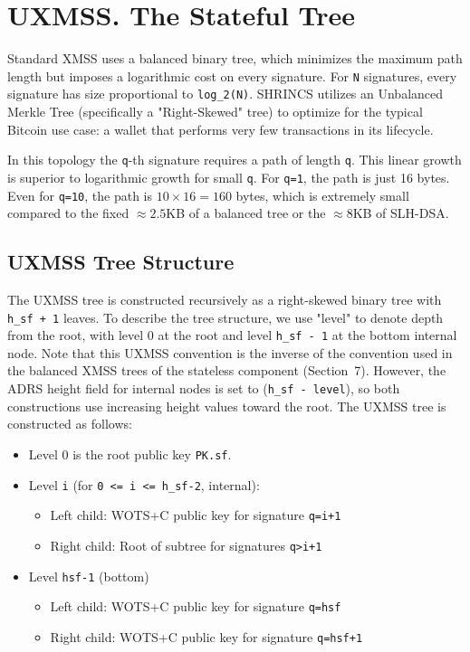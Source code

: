 \section{UXMSS. The Stateful Tree}
Standard XMSS uses a balanced binary tree, which minimizes the maximum path length but imposes a logarithmic cost on every signature. For \texttt{N} signatures, every signature has size proportional to \texttt{log\_2(N)}. SHRINCS utilizes an Unbalanced Merkle Tree (specifically a "Right-Skewed" tree) to optimize for the typical Bitcoin use case: a wallet that performs very few transactions in its lifecycle.

In this topology the \texttt{q}-th signature requires a path of length \texttt{q}. This linear growth is superior to logarithmic growth for small \texttt{q}. For \texttt{q=1}, the path is just 16 bytes. Even for \texttt{q=10}, the path is $10 \times 16 = 160$ bytes, which is extremely small compared to the fixed $\approx 2.5$KB of a balanced tree or the $\approx 8$KB of SLH-DSA.

\subsection{UXMSS Tree Structure}
The UXMSS tree is constructed recursively as a right-skewed binary tree with \texttt{h\_sf + 1} leaves. To describe the tree structure, we use "level" to denote depth from the root, with level 0 at the root and level \texttt{h\_sf - 1} at the bottom internal node. Note that this UXMSS convention is the inverse of the convention used in the balanced XMSS trees of the stateless component (Section~7). However, the ADRS height field for internal nodes is set to (\texttt{h\_sf - level}), so both constructions use increasing height values toward the root.
The UXMSS tree is constructed as follows:
\begin{itemize}
    \item Level 0 is the root public key \texttt{PK.sf}.
    \item Level \texttt{i} (for \texttt{0 <= i <= h\_sf-2}, internal):
    \begin{itemize}
        \item  Left child: WOTS+C public key for signature \texttt{q=i+1}
        \item  Right child: Root of subtree for signatures \texttt{q>i+1}
    \end{itemize}
    \item Level \texttt{hsf-1} (bottom)
    \begin{itemize}
        \item Left child: WOTS+C public key for signature \texttt{q=hsf}
        \item Right child: WOTS+C public key for signature \texttt{q=hsf+1}
    \end{itemize}
\end{itemize}

